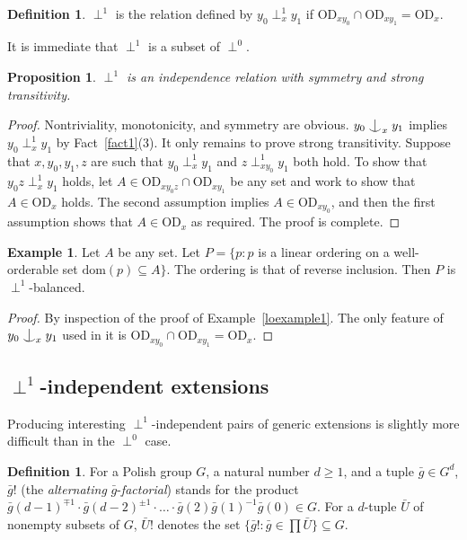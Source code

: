 \documentclass{article}
\newcommand{\dom}{\mathrm{dom}}
\newcommand{\vd}{\mathrm{OD}}
\newcommand{\forkindep}[1][]{%
  \mathrel{
    \mathop{
      \vcenter{
        \hbox{\oalign{\noalign{\kern-.3ex}\hfil$\vert$\hfil\cr
              \noalign{\kern-.7ex}
              $\smile$\cr\noalign{\kern-.3ex}}}
      }
    }\displaylimits_{#1}
  }
}
\newtheorem{proposition}[theorem]{Proposition}
\theoremstyle{definition}
\newtheorem{definition}[theorem]{Definition}
\newtheorem{example}[theorem]{Example}
\begin{document}
\begin{definition}
\label{perp1definition}
$\perp^1$ is the relation defined by $y_0\perp^1_xy_1$ if $\vd_{xy_0}\cap\vd_{xy_1}=\vd_x$.
\end{definition}

\noindent It is immediate that $\perp^1$ is a subset of $\perp^0$.

\begin{proposition}
$\perp^1$ is an independence relation with symmetry and strong transitivity.
\end{proposition}

\begin{proof}
Nontriviality, monotonicity, and symmetry are obvious. $y_0\forkindep_xy_1$ implies $y_0\perp^1_xy_1$ by Fact~\ref{fact1}(3). It only remains to prove strong transitivity. Suppose that $x, y_0, y_1, z$ are such that $y_0\perp^1_xy_1$ and $z\perp^1_{xy_0}y_1$ both hold. To show that $y_0z\perp^1_xy_1$ holds, let $A\in\vd_{xy_0z}\cap\vd_{xy_1}$ be any set and work to show that $A\in\vd_x$ holds. The second assumption implies $A\in\vd_{xy_0}$, and then the first assumption shows that $A\in\vd_x$ as required. The proof is complete.
\end{proof}


\begin{example}
Let $A$ be any set. Let $P=\{p\colon p$ is a linear ordering on a well-orderable set $\dom(p)\subseteq A\}$. The ordering is that of reverse inclusion. Then $P$ is $\perp^1$-balanced.
\end{example}

\begin{proof}
By inspection of the proof of Example~\ref{loexample1}. The only feature of $y_0\forkindep[x]y_1$ used in it is $\vd_{xy_0}\cap\vd_{xy_1}=\vd_x$.
\end{proof}


\subsection{$\perp^1$-independent extensions}

\noindent Producing interesting $\perp^1$-independent pairs of generic extensions is slightly more difficult than in the $\perp^0$ case. 

\begin{definition}
For a Polish group $G$, a natural number $d\geq 1$, and a tuple $\bar g\in G^d$, $\bar g!$ (the \emph{alternating} $\bar g$-\emph{factorial}) stands for the product $\bar g(d-1)^{\mp 1}\cdot \bar g(d-2)^{\pm 1}\cdot\dots\cdot\bar g(2)\bar g(1)^{-1}\bar g(0)\in G$. For a $d$-tuple $\bar U$ of nonempty subsets of $G$, $\bar U!$ denotes the set $\{\bar g!\colon \bar g\in\prod\bar U\}\subseteq G$.
\end{definition}
\end{document}
